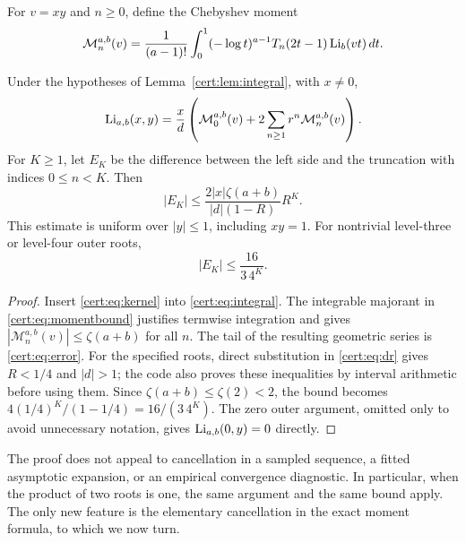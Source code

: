 \begin{definition}
For $v=xy$ and $n\ge0$, define the Chebyshev moment
\begin{equation}
 \mathcal M_n^{a,b}(v)=\frac1{(a-1)!}
 \int_0^1(-\log t)^{a-1}T_n(2t-1)\operatorname{Li}_b(vt)\,dt.
\label{cert:eq:Chebmoment}
\end{equation}
\end{definition}

\begin{theorem}
\label{cert:thm:spectral}
Under the hypotheses of Lemma~\ref{cert:lem:integral}, with $x\ne0$,
\begin{equation}
 \operatorname{Li}_{a,b}(x,y)=\frac{x}{d}
 \left(\mathcal M_0^{a,b}(v)+2\sum_{n\ge1}r^n\mathcal M_n^{a,b}(v)\right).
\label{cert:eq:spectral}
\end{equation}
For $K\ge1$, let $E_K$ be the difference between the left side and the
truncation with indices $0\le n<K$. Then
\begin{equation}
 |E_K|\le
 \frac{2|x|\zeta(a+b)}{|d|(1-R)}R^K.
\label{cert:eq:error}
\end{equation}
This estimate is uniform over $|y|\le1$, including $xy=1$.
For nontrivial level-three or level-four outer roots,
\begin{equation}
 |E_K|\le\frac{16}{3\,4^K}.
\label{cert:eq:uniformerror}
\end{equation}
\end{theorem}
\begin{proof}
Insert \eqref{cert:eq:kernel} into \eqref{cert:eq:integral}. The integrable majorant
in \eqref{cert:eq:momentbound} justifies termwise integration and gives
$|\mathcal M_n^{a,b}(v)|\le\zeta(a+b)$ for all $n$.
The tail of the resulting geometric series is \eqref{cert:eq:error}.
For the specified roots, direct substitution in \eqref{cert:eq:dr} gives
$R<1/4$ and $|d|>1$; the code also proves these inequalities by interval
arithmetic before using them. Since $\zeta(a+b)\le\zeta(2)<2$, the
bound becomes $4(1/4)^K/(1-1/4)=16/(3\,4^K)$.
The zero outer argument, omitted only to avoid unnecessary notation,
gives $\operatorname{Li}_{a,b}(0,y)=0$ directly.
\end{proof}

The proof does not appeal to cancellation in a sampled sequence, a fitted
asymptotic expansion, or an empirical convergence diagnostic. In particular,
when the product of two roots is one, the same argument and the same bound
apply. The only new feature is the elementary cancellation in the exact
moment formula, to which we now turn.

